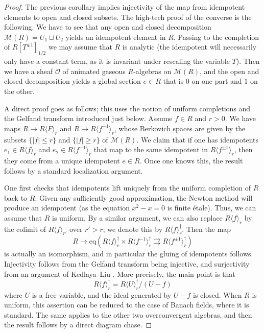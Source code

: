 \documentclass[11pt]{amsart}
\numberwithin{equation}{section}
\numberwithin{theorem}{section}
\theoremstyle{definition}
\begin{document}
\begin{proof} The previous corollary implies injectivity of the map from idempotent elements to open and closed subsets. The high-tech proof of the converse is the following. We have to see that any open and closed decomposition $\mathcal M(R) = U_1\sqcup U_2$ yields an idempotent element in $R$. Passing to the completion of $R[T^{\pm 1}]_{1/2}$ we may assume that $R$ is analytic (the idempotent will necessarily only have a constant term, as it is invariant under rescaling the variable $T$). Then we have a sheaf $\mathcal O$ of animated gaseous $R$-algebras on $\mathcal M(R)$, and the open and closed decomposition yields a global section $e\in R$ that is $0$ on one part and $1$ on the other.

A direct proof goes as follows; this uses the notion of uniform completions and the Gelfand transform introduced just below. Assume $f\in R$ and $r>0$. We have maps $R\to R\langle F\rangle_r$ and $R\to R\langle f^{-1}\rangle_{r}$, whose Berkovich spaces are given by the subsets $\{|f|\leq r\}$ and $\{|f|\geq r\}$ of $\mathcal M(R)$. We claim that if one has idempotents $e_1\in R\langle f\rangle_r$ and $e_2\in R\langle f^{-1}\rangle_{r}$ that map to the same idempotent in $R\langle f^{\pm 1}\rangle_r$, then they come from a unique idempotent $e\in R$. Once one knows this, the result follows by a standard localization argument.

One first checks that idempotents lift uniquely from the uniform completion of $R$ back to $R$: Given any sufficiently good approximation, the Newton method will produce an idempotent (as the equation $x^2-x=0$ is finite \'etale). Thus, we can assume that $R$ is uniform. By a similar argument, we can also replace $R\langle f\rangle_r$ by the colimit of $R\langle f\rangle_{r'}$ over $r'>r$; we denote this by $R\langle f\rangle_r^\dagger$. Then the map
\[
R\to \mathrm{eq}(R\langle f\rangle_r^\dagger\times R\langle f^{-1}\rangle_{r}^\dagger\rightrightarrows R\langle f^{\pm 1}\rangle_r^\dagger)
\]
is actually an isomorphism, and in particular the gluing of idempotents follows. Injectivity follows from the Gelfand transform being injective, and surjectivity from an argument of Kedlaya--Liu \cite[Corollary 2.8.9]{KedlayaLiu1}. More precisely, the main point is that
\[
R\langle f\rangle_r^\dagger = R\langle U\rangle_r^\dagger / (U-f)
\]
where $U$ is a free variable, and the ideal generated by $U-f$ is closed. When $R$ is uniform, this assertion can be reduced to the case of Banach fields, where it is standard. The same applies to the other two overconvergent algebras, and then the result follows by a direct diagram chase.
\end{proof}
\end{document}
